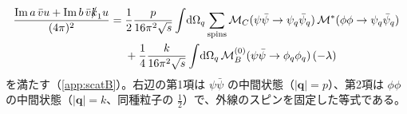 \documentclass[a4paper,10pt]{ltjsarticle}
\newcommand{\dd}{\mathrm{d}}
\begin{document}
\begin{equation}
\begin{aligned}
\frac{\mathrm{Im}\,a\,\bar vu+\mathrm{Im}\,b\,\bar v\slashed k_1u}{(4\pi)^2}
={}&\frac12\frac{p}{16\pi^2\sqrt s}\int\!\dd\Omega_q\sum_{\mathrm{spins}}\mathcal M_C(\psi\bar\psi\to\psi_q\bar\psi_q)\,\mathcal M^*(\phi\phi\to\psi_q\bar\psi_q)\\
&+\frac14\frac{k}{16\pi^2\sqrt s}\int\!\dd\Omega_q\,\mathcal M_B^{(0)}(\psi\bar\psi\to\phi_q\phi_q)\,(-\lambda)
\end{aligned}
\label{eq:unitB}
\end{equation}
を満たす（\ref{app:scatB}）。右辺の第1項は $\psi\bar\psi$ の中間状態（$|\boldsymbol q|=p$）、第2項は $\phi\phi$ の中間状態（$|\boldsymbol q|=k$、同種粒子の $\frac12$）で、外線のスピンを固定した等式である。
\end{document}
